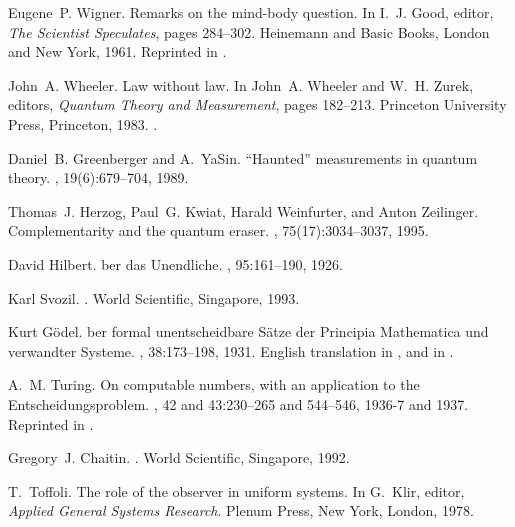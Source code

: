 \begin{thebibliography}{10}

Eugene~P. Wigner.
\newblock Remarks on the mind-body question.
\newblock In I.~J. Good, editor, {\em The Scientist Speculates}, pages
  284--302. Heinemann and Basic Books, London and New York, 1961.
\newblock Reprinted in \cite[pp. 168-181]{wheeler-Zurek:83}.

John~A. Wheeler.
\newblock Law without law.
\newblock In John~A. Wheeler and W.~H. Zurek, editors, {\em Quantum Theory and
  Measurement}, pages 182--213. Princeton University Press, Princeton, 1983.
\newblock \cite{wheeler-Zurek:83}.

Daniel~B. Greenberger and A.~YaSin.
\newblock ``{H}aunted'' measurements in quantum theory.
, 19(6):679--704, 1989.

Thomas~J. Herzog, Paul~G. Kwiat, Harald Weinfurter, and Anton Zeilinger.
\newblock Complementarity and the quantum eraser.
, 75(17):3034--3037, 1995.

David Hilbert.
ber das {U}nendliche.
, 95:161--190, 1926.

Karl Svozil.
.
\newblock World Scientific, Singapore, 1993.

Kurt G{\"{o}}del.
ber formal unentscheidbare {S\"{a}}tze der {P}rincipia
  {M}athematica und verwandter {S}ysteme.
, 38:173--198, 1931.
\newblock English translation in \cite{godel-ges1}, and in \cite{davis}.

A.~M. Turing.
\newblock On computable numbers, with an application to the
  {E}ntscheidungsproblem.
, 42
  and 43:230--265 and 544--546, 1936-7 and 1937.
\newblock Reprinted in \cite{davis}.

Gregory~J. Chaitin.
.
\newblock World Scientific, Singapore, 1992.

T.~Toffoli.
\newblock The role of the observer in uniform systems.
\newblock In G.~Klir, editor, {\em Applied General Systems Research}. Plenum
  Press, New York, London, 1978.


\end{thebibliography}
